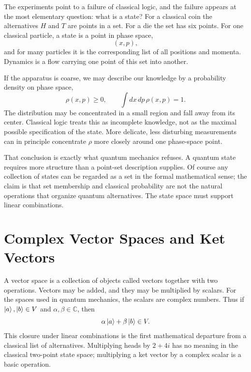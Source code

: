 The experiments point to a failure of classical logic, and the failure
appears at the most elementary question: what is a state? For a classical
coin the alternatives \(H\) and \(T\) are points in a set. For a die the set
has six points. For one classical particle, a state is a point in phase
space,
\begin{equation}
 (x,p),
\end{equation}
and for many particles it is the corresponding list of all positions and
momenta. Dynamics is a flow carrying one point of this set into another.

If the apparatus is coarse, we may describe our knowledge by a probability
density on phase space,
\begin{equation}
 \rho(x,p)\geq0,
 \qquad
 \int dx\,dp\,\rho(x,p)=1.
\end{equation}
The distribution may be concentrated in a small region and fall away from
its center. Classical logic treats this as incomplete knowledge, not as the
maximal possible specification of the state. More delicate, less disturbing
measurements can in principle concentrate \(\rho\) more closely around one
phase-space point.

That conclusion is exactly what quantum mechanics refuses. A quantum state
requires more structure than a point-set description supplies. Of course any
collection of states can be regarded as a set in the formal mathematical
sense; the claim is that set membership and classical probability are not
the natural operations that organize quantum alternatives. The state space
must support linear combinations.

\section{Complex Vector Spaces and Ket Vectors}

A vector space is a collection of objects called vectors together with two
operations. Vectors may be added, and they may be multiplied by scalars. For
the spaces used in quantum mechanics, the scalars are complex numbers. Thus
if \(\left\lvert a\right\rangle,\left\lvert b\right\rangle\in V\) and \(\alpha,\beta\in\mathbb C\), then
\begin{equation}
 \alpha\left\lvert a\right\rangle+\beta\left\lvert b\right\rangle\in V.
 \label{eq:l01-linear-combination}
\end{equation}
This closure under linear combinations is the first mathematical departure
from a classical list of alternatives. Multiplying heads by
\(2+4i\) has no meaning in the classical two-point state space; multiplying
a ket vector by a complex scalar is a basic operation.

